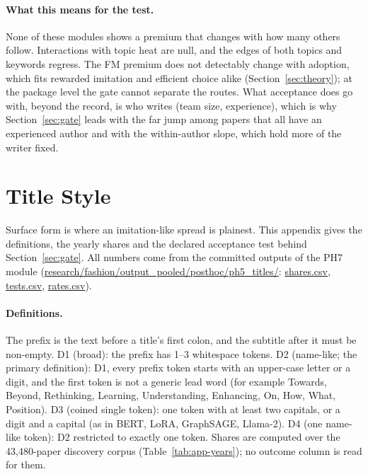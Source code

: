 \paragraph{What this means for the test.} None of these modules shows a premium that changes with how many others
follow. Interactions with topic heat are null, and the edges of both topics and keywords regress. The FM premium does
not detectably change with adoption, which fits rewarded imitation and efficient choice alike
(Section~\ref{sec:theory}); at the package level the gate cannot separate the routes. What acceptance does go with, beyond the record, is who writes (team size, experience), which is why
Section~\ref{sec:gate} leads with the far jump among papers that all have an experienced author and with the
within-author slope, which hold more of the writer fixed.

\FloatBarrier
\section{Title Style}\label{app:titles}

Surface form is where an imitation-like spread is plainest. This appendix gives the definitions, the yearly shares and
the declared acceptance test behind Section~\ref{sec:gate}. All numbers come from the committed outputs of the PH7
module (\url{research/fashion/output_pooled/posthoc/ph5_titles/}: \url{shares.csv}, \url{tests.csv},
\url{rates.csv}).

\paragraph{Definitions.} The prefix is the text before a title's first colon, and the subtitle after it must be
non-empty. D1 (broad): the prefix has 1--3 whitespace tokens. D2 (name-like; the primary definition): D1, every prefix
token starts with an upper-case letter or a digit, and the first token is not a generic lead word (for example
Towards, Beyond, Rethinking, Learning, Understanding, Enhancing, On, How, What, Position). D3 (coined single token):
one token with at least two capitals, or a digit and a capital (as in BERT, LoRA, GraphSAGE, Llama-2). D4 (one
name-like token): D2 restricted to exactly one token. Shares are computed over the 43,480-paper discovery corpus
(Table~\ref{tab:app-years}); no outcome column is read for them.

